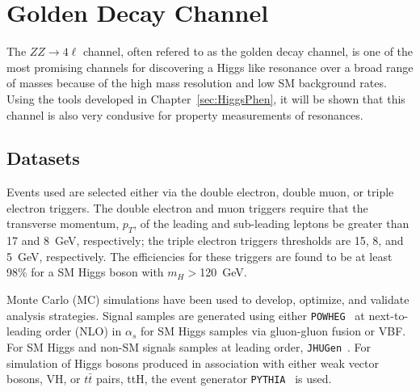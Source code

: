 \def\cm{\hbox{$\;\hbox{\rm cm}$}}
\def\eV{\hbox{$\;\hbox{\rm eV}$}}
\def\GeV{\hbox{$\;\hbox{\rm GeV}$}}
\def\MeV{\hbox{$\;\hbox{\rm MeV}$}}
\def\TeV{\hbox{$\;\hbox{\rm TeV}$}}
\def\ifb{\hbox{$fb^{-1}\rm$}}

\def\POWHEG{{\it POWHEG}}
\def\JHUGen{{\it JHUGen}}
\def\MCFM{{\it MCFM}}
\def\PYTHIA{{\it PYTHIA}}
\def\MADGRAPH{{\it MADGRAPH}}
\def\GEANTfour{{\it GEANT4}}

\newcommand{\KD}{$\mathscr{D}^{\rm kin}_{\rm bkg}$}
\newcommand{\superKD}{$\mathscr{D}_{\rm bkg}$}
\newcommand{\spinKD}{$\mathscr{D}_{J^P}$}
\newcommand{\Djet}{$\mathscr{D}_{\rm jet}$}
\newcommand{\pt}{$p_{T}$}
\newcommand{\sip}{$SIP_{3D}$}
\newcommand{\isocomb}{$ISO_{comb}$}


\section{Golden Decay Channel}
\label{sec:HZZ4l}
The $ZZ\to 4\ell$ channel, often refered to as the golden decay 
channel, is one of the most promising channels for discovering a 
Higgs like resonance over a broad range of masses because of 
the high mass resolution and low SM background rates.
Using the tools developed in Chapter~\ref{sec:HiggsPhen}, it will 
be shown that this channel is also very condusive for property
measurements of resonances.

\subsection{Datasets}
\label{sec:HZZ4ldatasets}

Events used are selected either via the
double electron, double muon, or triple electron triggers.  The
double electron and muon triggers require that the transverse
momentum, $p_T$, of the leading and sub-leading leptons be 
greater than 17 and 8~GeV, respectively; the triple electron 
triggers thresholds are 15, 8, and 5~GeV, respectively.  
The efficiencies for these triggers are found to be at least 98\% 
for a SM Higgs boson with $m_H>$120~GeV.  

Monte Carlo (MC) simulations have been used to develop, optimize, 
and validate analysis strategies.  Signal samples
are generated using either \verb+POWHEG+~\cite{Frixione:2007vw} at next-to-leading 
order (NLO) in $\alpha_s$ for SM Higgs samples via gluon-gluon 
fusion or VBF.  For SM Higgs and non-SM signals samples at leading
order,
\verb+JHUGen+~\cite{Gao:2010qx,Bolognesi:2012mm}.  
For simulation of Higgs bosons produced in association
with either weak vector bosons, VH, or $t\bar{t}$ pairs, ttH, 
the event generator \verb+PYTHIA+~\cite{Sjostrand:2006za} is used.  

